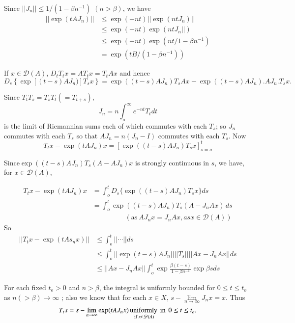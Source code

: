 Since $|| J_n || \le 1 / (1- \beta n^{-1})$ $(n > \beta)$, we have 
\begin{align*}
 || \exp (t A J_n) || & \le \exp (-nt) ||\exp (nt J_n )|| \\
 & \le \exp (-nt) \exp (nt J_n ||) \\
 &\le \exp (-nt) \exp (nt /1 - \beta n^{-1}) \\
 &= \exp (tB/(1- \beta n^{-1}))
\end{align*}

If $x \in \mathscr{D}(A)$, $D_t T_t x= A T_t x= T_t A x$ and hence 
{\fontsize{10pt}{12pt}\selectfont
\begin{equation*}
 D_s \left\{ \exp [(t-s) A J_n)] T_s x \right\} = \exp ((t-s)A J_n)
 T_s A x - \exp((t-s)A J_n).AJ_n. T_s x. 
\end{equation*}}\relax

Since $T_t T_s= T_s T_t (= T_{t+s})$,
$$
J_n = n \int^{\infty}_o e^{-nt} T_t dt
$$
is the limit of Riemannian sums each of which commutes with each
$T_s$; so $J_n$ commutes with each $T_s$ so that $A J_n =n(J_n-I)$
commutes with each $T_s$. Now 
$$
T_t x- \exp (t A J_n) x= [ \exp ((t-s) A J_n) T_s x]^t_{s=o}
$$

Since\pageoriginale $\exp ((t-s) A J_n)T_s(A-A J_n)x$ is strongly continuous in $s$,
we have, for $x \in \mathscr{D} (A)$, 

\begin{align*}
 T_t x- \exp (t A J_n)x &= \int^t_o D_s \bigg\{ \exp ((t-s)A J_n)T_s
 x \bigg\} ds\\ 
 & = \int^t_o \exp(( t-s)A J_n) T_s (A- J_n A x)\, ds\\ 
 & \hspace{2cm}(\text{as}~ A J_n x= J_n A
 x, as x \in \mathscr{D}(A)) 
\end{align*}
So
\begin{align*}
 || T_t x - \exp(t A s_n x) || & \le \int^t_o || \cdots || ds\\
 & \le \int^t_o || \exp (t-s) A J_n || || T_s || || Ax- J_n A x || ds\\
 & \le || Ax - J_n A x || \int^t_o \exp \frac{\beta(t-s)}{1- \beta
  n^{-1}} \exp \beta s ds 
\end{align*}

For each fixed $t_o >0$ and $n > \beta$, the integral is uniformly
bounded for $0 \le t \le t_o$ as $n(> \beta)\to \infty$ ; also we know
that for each $x \in X$, $s-\lim\limits_{n \to \infty} J_n
x=x$. Thus 
$$
T_t s=s- \lim_{n \to \infty} \exp (t A J_n x) \operatorname*{uniformly}_{ \text{ if }
 x \in \mathscr{D}(A)}\text{ in}~ \,0 \le t \le t_o, 
$$

